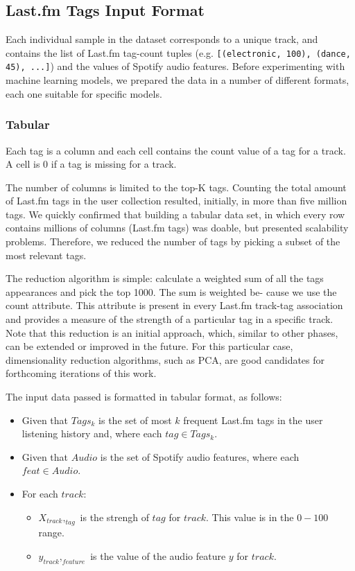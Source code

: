 \documentclass[sn-mathphys]{sn-jnl}%
\theoremstyle{thmstyleone}%
\theoremstyle{thmstyletwo}%
\theoremstyle{thmstylethree}%
\begin{document}
\subsection{Last.fm Tags Input Format}

Each individual sample in the dataset corresponds to a unique track,
and contains the list of Last.fm tag-count tuples (e.g. \verb|[(electronic, 100), (dance, 45), ...]|)
and the values of Spotify audio features.
Before experimenting with machine learning models, we prepared the data in a number of different formats,
each one suitable for specific models.


\subsubsection{Tabular}
Each tag is a column and each cell contains the count value of a tag for a track.
A cell is 0 if a tag is missing for a track.

The number of columns is limited to the top-K tags.
Counting the total amount of Last.fm tags in the user collection resulted, initially, in more than five million tags.
We quickly confirmed that building a tabular data set, in which every row contains millions of columns (Last.fm tags)
was doable, but presented scalability problems.
Therefore, we reduced the number of tags by picking a subset of the most relevant tags.

The reduction algorithm is simple: calculate a weighted sum of all the tags appearances and pick the top 1000.
The sum is weighted be- cause we use the count attribute.
This attribute is present in every Last.fm track-tag association and provides a measure of the strength of a particular tag in a specific track.
Note that this reduction is an initial approach, which, similar to other phases, can be extended or improved in the future. For this particular case, dimensionality reduction algorithms, such as PCA, are good candidates for forthcoming iterations of this work.

The input data passed is formatted in tabular format, as follows:

\begin{itemize}
      \item Given that $Tags_{k}$ is the set of most $k$ frequent Last.fm tags in the user listening history
            and, where each $tag \in Tags_{k}$.
      \item Given that $Audio$ is the set of Spotify audio features, where each $feat \in Audio$.
      \item For each $track$:
      \begin{itemize}
            \item $X_{track},_{tag}$ is the strengh of $tag$ for $track$. This value is in the $0-100$ range.
            \item $y_{track},_{feature}$ is the value of the audio feature $y$ for $track$.
      \end{itemize}
\end{itemize}
\end{document}
